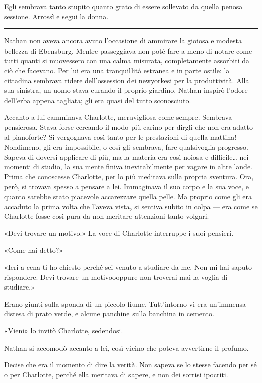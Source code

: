 \documentclass[a4paper,oneside,11pt]{memoir}
\begin{document}
Egli sembrava tanto stupito quanto grato di essere sollevato da quella penosa
sessione. Arrossì e segui la donna.

\plainbreak{1}

Nathan non aveva ancora avuto l'occasione di ammirare la gioiosa e modesta
bellezza di Ebensburg. Mentre passeggiava non poté fare a meno di notare come
tutti quanti si muovessero con una calma misurata, completamente assorbiti da
ciò che facevano. Per lui era una tranquillità estranea e in parte ostile: la
cittadina sembrava ridere dell'ossession dei newyorkesi per la produttività.
Alla sua sinistra, un uomo stava curando il proprio giardino. Nathan inspirò
l'odore dell'erba appena tagliata; gli era quasi del tutto sconosciuto.

Accanto a lui camminava Charlotte, meravigliosa come sempre. Sembrava
pensierosa. Stava forse cercando il modo più carino per dirgli che non era
adatto al pianoforte? Si vergognava così tanto per le prestazioni di quella
mattina! Nondimeno, gli era impossibile, o così gli sembrava, fare qualsivoglia
progresso. Sapeva di doversi applicare di più, ma la materia era così noiosa e
difficile\dots{} nei momenti di studio, la sua mente finiva inevitabilmente per
vagare in altre lande. Prima che conoscesse Charlotte, per lo più meditava sulla
propria sventura. Ora, però, si trovava spesso a pensare a lei. Immaginava il
suo corpo e la sua voce, e quanto sarebbe stato piacevole accarezzare quella
pelle. Ma proprio come gli era accaduto la prima volta che l'aveva vista, si
sentiva subito in colpa --- era come se Charlotte fosse così pura da non
meritare attenzioni tanto volgari.

«Devi trovare un motivo.» La voce di Charlotte interruppe i suoi pensieri.

«Come hai detto?»

«Ieri a cena ti ho chiesto perché sei venuto a studiare da me. Non mi hai saputo
rispondere. Devi trovare un motivoooppure non troverai mai la voglia di
studiare.»

Erano giunti sulla sponda di un piccolo fiume. Tutt'intorno vi era un'immensa
distesa di prato verde, e alcune panchine sulla banchina in cemento.

«Vieni» lo invitò Charlotte, sedendosi.

Nathan si accomodò accanto a lei, così vicino che poteva avvertirne il profumo.

Decise che era il momento di dire la verità. Non sapeva se lo stesse facendo per
sé o per Charlotte, perché ella meritava di sapere, e non dei sorrisi ipocriti.
\end{document}
